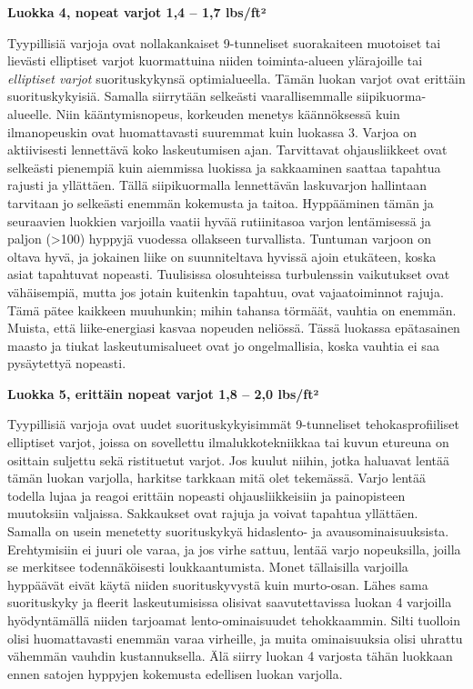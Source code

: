 \textbf{Luokka 4, nopeat varjot 1,4 – 1,7 lbs/ft²} 


Tyypillisiä varjoja ovat nollakankaiset 9-tunneliset suorakaiteen muotoiset tai lievästi elliptiset varjot kuormattuina niiden toiminta-alueen ylärajoille tai \textit{elliptiset varjot} suorituskykynsä optimialueella. Tämän luokan varjot ovat erittäin suorituskykyisiä. Samalla siirrytään selkeästi vaarallisemmalle siipikuorma-alueelle. Niin kääntymisnopeus, korkeuden menetys käännöksessä kuin ilmanopeuskin ovat huomattavasti suuremmat kuin luokassa 3. Varjoa on aktiivisesti lennettävä koko laskeutumisen ajan. Tarvittavat ohjausliikkeet ovat selkeästi pienempiä kuin aiemmissa luokissa ja sakkaaminen saattaa tapahtua rajusti ja yllättäen. Tällä siipikuormalla lennettävän laskuvarjon hallintaan tarvitaan jo selkeästi enemmän kokemusta ja taitoa. Hyppääminen tämän ja seuraavien luokkien varjoilla vaatii hyvää rutiinitasoa varjon lentämisessä ja paljon (>100) hyppyjä vuodessa ollakseen turvallista. Tuntuman varjoon on oltava hyvä, ja jokainen liike on suunniteltava hyvissä ajoin etukäteen, koska asiat tapahtuvat nopeasti. Tuulisissa olosuhteissa turbulenssin vaikutukset ovat vähäisempiä, mutta jos jotain kuitenkin tapahtuu, ovat vajaatoiminnot rajuja. Tämä pätee kaikkeen muuhunkin; mihin tahansa törmäät, vauhtia on enemmän. Muista, että liike-energiasi kasvaa nopeuden neliössä. Tässä luokassa epätasainen maasto ja tiukat laskeutumisalueet ovat jo ongelmallisia, koska vauhtia ei saa pysäytettyä nopeasti. 


\textbf{Luokka 5, erittäin nopeat varjot 1,8 – 2,0 lbs/ft²} 


Tyypillisiä varjoja ovat uudet suorituskykyisimmät 9-tunneliset tehokasprofiiliset elliptiset varjot, joissa on sovellettu ilmalukkotekniikkaa tai kuvun etureuna on osittain suljettu sekä ristituetut varjot. Jos kuulut niihin, jotka haluavat lentää tämän luokan varjolla, harkitse tarkkaan mitä olet tekemässä. Varjo lentää todella lujaa ja reagoi erittäin nopeasti ohjausliikkeisiin ja painopisteen muutoksiin valjaissa. Sakkaukset ovat rajuja ja voivat tapahtua yllättäen. Samalla on usein menetetty suorituskykyä hidaslento- ja avausominaisuuksista. Erehtymisiin ei juuri ole varaa, ja jos virhe sattuu, lentää varjo nopeuksilla, joilla se merkitsee todennäköisesti loukkaantumista. Monet tällaisilla varjoilla hyppäävät eivät käytä niiden suorituskyvystä kuin murto-osan. Lähes sama suorituskyky ja fleerit laskeutumisissa olisivat saavutettavissa luokan 4 varjoilla hyödyntämällä niiden tarjoamat lento-ominaisuudet tehokkaammin. Silti tuolloin olisi huomattavasti enemmän varaa virheille, ja muita ominaisuuksia olisi uhrattu vähemmän vauhdin kustannuksella. Älä siirry luokan 4 varjosta tähän luokkaan ennen satojen hyppyjen kokemusta edellisen luokan varjolla. 


